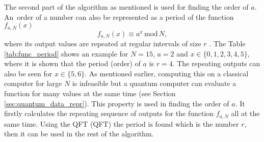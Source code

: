 The second part of the algorithm as mentioned is used for finding the order of $a$. An~order of a number can also be represented as a period of the function $f_{a,N}(x)$
\begin{equation}
  f_{a,N}(x)\equiv a^x\,\mathrm{mod}\,N,
\end{equation}
where its output values are repeated at regular intervals of size $r$ \cite{Yanofsky2008}. The Table \ref{tab:func_period} shows an example for $N=15$, $a=2$ and $x\in\{0,1,2,3,4,5\}$, where it is shown that the period (order) of $a$ is $r=4$. The repeating outputs can also be seen for $x\in\{5,6\}$. As mentioned earlier, computing this on a classical computer for large $N$ is infeasible but a quantum computer can evaluate a function for many values at the same time (see Section \ref{sec:quantum_data_repr}). This property is used in finding the order of $a$. It firstly calculates the repeating sequence of outputs for the function $f_{a,N}$ all at the same time. Using the QFT (\acl{QFT}) the period is found which is the number $r$, then it can be used in the rest of the algorithm. \cite{McMahon2008}

